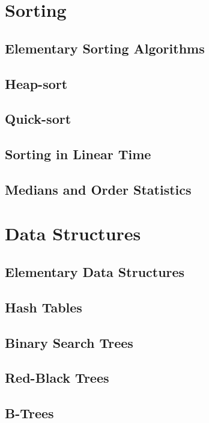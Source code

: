 \documentclass[10pt]{book}
\begin{document}
		\chapter{Sorting}
			\section{Elementary Sorting Algorithms}

			\section{Heap-sort}

			\section{Quick-sort}

			\section{Sorting in Linear Time}

			\section{Medians and Order Statistics}

		\chapter{Data Structures}
			\section{Elementary Data Structures}

			\section{Hash Tables}

			\section{Binary Search Trees}

			\section{Red-Black Trees}

			\section{B-Trees}
\end{document}
